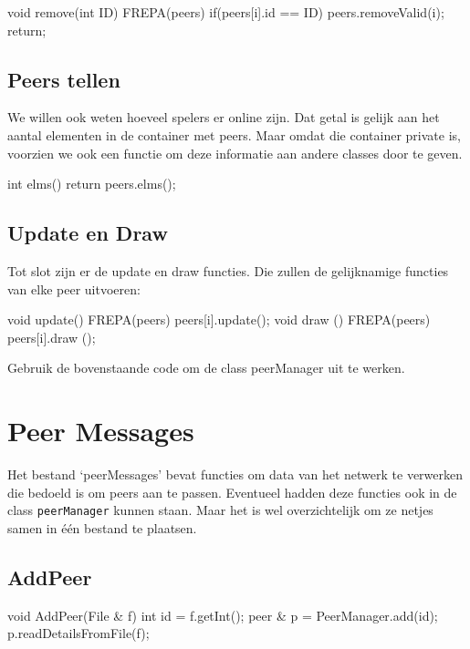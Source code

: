 \begin{code}
void remove(int ID)
{
	FREPA(peers)
	{
		 if(peers[i].id == ID)
		 {
				peers.removeValid(i);
				return;
		 }
	}
}
\end{code}

\subsection{Peers tellen}
We willen ook weten hoeveel spelers er online zijn. Dat getal is gelijk aan het aantal elementen in de container met peers. Maar omdat die container private is, voorzien we ook een functie om deze informatie aan andere classes door te geven.

\begin{code}
int elms() 
{
	return peers.elms();
}
\end{code}

\subsection{Update en Draw}
Tot slot zijn er de update en draw functies. Die zullen de gelijknamige functies van elke peer uitvoeren:

\begin{code}
void update() { FREPA(peers) peers[i].update(); }
void draw  () { FREPA(peers) peers[i].draw  (); }
\end{code}

\begin{exercise}
Gebruik de bovenstaande code om de class peerManager uit te werken.
\end{exercise}

\section{Peer Messages}

Het bestand `peerMessages' bevat functies om data van het netwerk te verwerken die bedoeld is om peers aan te passen. Eventueel hadden deze functies ook in de class \texttt{peerManager} kunnen staan. Maar het is wel overzichtelijk om ze netjes samen in \'e\'en bestand te plaatsen.

\subsection{AddPeer}
\begin{code}
void AddPeer(File & f)
{
   int id = f.getInt();
   peer & p = PeerManager.add(id);
   p.readDetailsFromFile(f);
}
\end{code}

